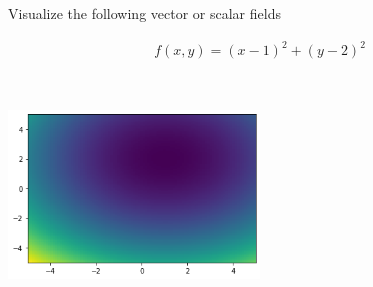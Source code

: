 Visualize the following vector or scalar fields

\begin{align*}
    f(x, y) = (x - 1)^2 + (y - 2)^2
\end{align*}

\begin{solution}\
\begin{center}
    \includegraphics[width=0.5\textwidth]{img/e3p1.png}
\end{center}
\end{solution}